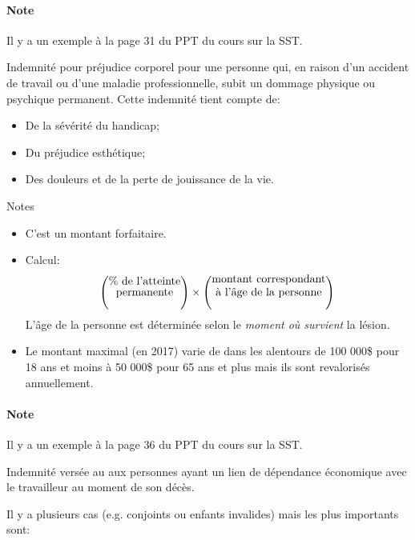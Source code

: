 \documentclass[10pt, french]{article}
\begin{document}
\begin{multicols*}{3}
\begin{algo2}
\paragraph{Note}	Il y a un exemple à la page 31 du PPT du cours sur la SST.
\end{algo2}

\begin{definitionNOHFILL}
Indemnité pour préjudice corporel pour une personne qui, en raison d'un accident de travail ou d'une maladie professionnelle, subit un dommage physique ou psychique permanent. Cette indemnité tient compte de:
\begin{itemize}[leftmargin = *]
	\item	De la sévérité du handicap;
	\item	Du préjudice esthétique;
	\item	Des douleurs et de la perte de jouissance de la vie.
\end{itemize}

Notes
\begin{itemize}[leftmargin = *]
	\item	C'est un montant forfaitaire.
	\item	Calcul: 
	\setlength{\mathindent}{-1.5cm}
		\begin{align*}
		\left(\shortstack{\% de l'atteinte\\ permanente}\right)	\times	\left(\shortstack{montant correspondant \\ à l'âge de la personne}\right)
		\end{align*}
	\setlength{\mathindent}{1cm}
			L'âge de la personne est déterminée selon le \textit{moment où survient} la lésion.
	\item	Le montant maximal (en 2017) varie de dans les alentours de 100 000\$ pour 18 ans et moins à 50 000\$ pour 65 ans et plus mais ils sont revalorisés annuellement.
\end{itemize}
\paragraph{Note}	Il y a un exemple à la page 36 du PPT du cours sur la SST.
\end{definitionNOHFILL}

\begin{definitionNOHFILL}
Indemnité versée au aux personnes ayant un lien de dépendance économique avec le travailleur au moment de son décès.

Il y a plusieurs cas (e.g. conjoints ou enfants invalides) mais les plus importants sont:


\end{definitionNOHFILL}
\end{multicols*}
\end{document}
